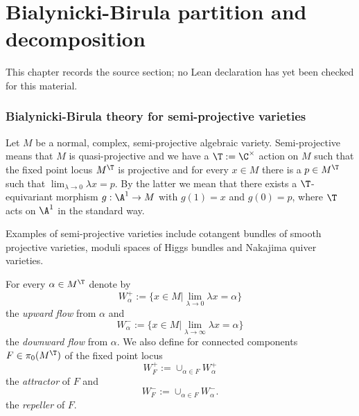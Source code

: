 \chapter{Bialynicki-Birula partition and decomposition}
\label{very-stable-higgs-bundles-equivariant-multiplicity-mirror-symmetry-chapter-02}

\begin{remark}
\label{very-stable-higgs-bundles-equivariant-multiplicity-mirror-symmetry-chapter-02-source}
This chapter records the source section; no Lean declaration has yet been checked for this material.
\notready
\end{remark}

\label{bb}

\subsection{Bialynicki-Birula theory for semi-projective varieties}

Let $M$ be a normal, complex, semi-projective algebraic variety.  Semi-projective means that $M$ is quasi-projective and we have a $\T:=\C^\times$ action on $M$  such that  the fixed point locus $M^{\T}$ is projective and   for every $x\in M$ there is a $p\in M^\T$ such that
$\lim_{\lambda\to 0}  \lambda x=p$. By the latter we mean that there exists a $\T$-equivariant morphism $g:\A^1\to M$ with $g(1)=x$ and $g(0)=p$, where $\T$ acts on $\A^1$ in the standard way.

Examples of semi-projective varieties include  cotangent bundles of smooth projective varieties, moduli spaces of Higgs bundles and Nakajima quiver varieties.

For every $\alpha\in M^{\T}$ denote by  $$W^+_\alpha:= \{ x\in M | \lim_{\lambda\to 0}  \lambda x = \alpha\}$$ the {\em upward flow} from $\alpha$ and $$W^-_\alpha:= \{ x\in M | \lim_{\lambda\to \infty}  \lambda x = \alpha\}$$ the {\em downward flow} from $\alpha$. We also define for connected components $F\in \pi_0(M^{\T})$ of the fixed point locus $$W^+_F:=\cup_{\alpha\in F} W^+_\alpha$$ the {\em attractor} of $F$
and $$W^-_F:=\cup_{\alpha\in F} W^-_\alpha.$$ the {\em repeller} of $F$.

